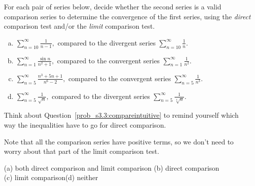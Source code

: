 \begin{Mquestion}
For each pair of series below, decide whether the second series is a valid comparison series to determine the convergence of the first series, using the  \emph{direct} comparison test and/or the \emph{limit} comparison test.
\begin{enumerate}[(a)]
\item $\displaystyle\sum_{n=10}^{\infty} \frac{1}{n-1},$ compared to the divergent series
$\displaystyle\sum_{n=10}^{\infty} \frac{1}{n}.$
\item $\displaystyle\sum_{n=1}^{\infty} \frac{\sin n}{n^2+1},$ compared to the convergent series
$\displaystyle\sum_{n=1}^{\infty} \frac{1}{n^2}.$
\item $\displaystyle\sum_{n=5}^{\infty} \frac{n^3+5n+1}{n^6-2},$ compared to the convergent series
$\displaystyle\sum_{n=5}^{\infty} \frac{1}{n^3}.$
\item $\displaystyle\sum_{n=5}^{\infty} \frac{1}{\sqrt{n}},$ compared to the divergent series
$\displaystyle\sum_{n=5}^{\infty} \frac{1}{\sqrt[4]n}.$
\end{enumerate}
\end{Mquestion}
\begin{hint}
Think about Question~\ref{prob_s3.3:compareintuitive} to remind yourself which way the inequalities have to go for direct comparison.

Note that all the comparison series have positive terms, so we don't need to worry about that part of the limit comparison test.
\end{hint}
\begin{answer}
(a) both direct comparison and limit comparison \qquad (b) direct comparison\\
 (c) limit comparison\qquad (d) neither
\end{answer}
